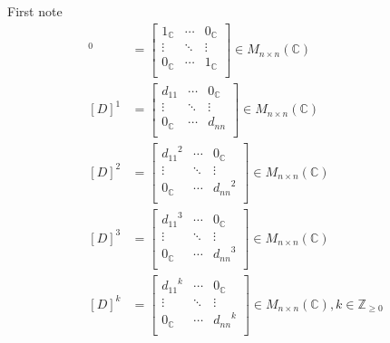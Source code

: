 \documentclass[12pt, letterpaper]{article}
\newcommand{\Z}{\mathbb{Z}}
\newcommand{\C}{\mathbb{C}}
\begin{document}
First note
\begin{align*}
[D]^0 &= \begin{bmatrix}
1_\C & \cdots & 0_\C \\
\vdots & \ddots & \vdots \\
0_\C & \cdots & 1_\C \\
\end{bmatrix} \in M_{n\times n}(\C) \\
[D]^1 &= \begin{bmatrix}
d_{11} & \cdots & 0_\C\\
\vdots & \ddots & \vdots \\
0_\C & \cdots & d_{nn} \\
\end{bmatrix} \in M_{n\times n}(\C) \\
[D]^2 &= \begin{bmatrix}
{d_{11}}^2 & \cdots & 0_\C\\
\vdots & \ddots & \vdots \\
0_\C & \cdots & {d_{nn}}^2 \\
\end{bmatrix} \in M_{n\times n}(\C) \\
[D]^3 &= \begin{bmatrix}
{d_{11}}^3 & \cdots & 0_\C\\
\vdots & \ddots & \vdots \\
0_\C & \cdots & {d_{nn}}^3 \\
\end{bmatrix} \in M_{n\times n}(\C) \\
[D]^k &= \begin{bmatrix}
{d_{11}}^k & \cdots & 0_\C\\
\vdots & \ddots & \vdots \\
0_\C & \cdots & {d_{nn}}^k \\
\end{bmatrix} \in M_{n\times n}(\C), k \in \Z_{\ge 0}
\end{align*}
\end{document}
